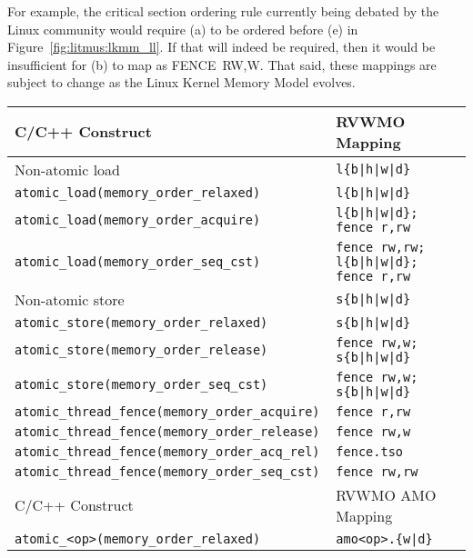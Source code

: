 For example, the critical section ordering rule currently being debated by the Linux community would require (a) to be ordered before (e) in Figure~\ref{fig:litmus:lkmm_ll}.
If that will indeed be required, then it would be insufficient for (b) to map as FENCE~RW,W.
That said, these mappings are subject to change as the Linux Kernel Memory Model evolves.

\begin{table}[h!]
  \centering
  \begin{tabular}{|l|l|}
    \hline
    C/C++ Construct                            & RVWMO Mapping \\
    \hline
    \hline
    Non-atomic load                            & \tt l\{b|h|w|d\}               \\
    \hline
    \tt atomic\_load(memory\_order\_relaxed)   & \tt l\{b|h|w|d\}               \\
    \hline
    \tt atomic\_load(memory\_order\_acquire)   & \tt l\{b|h|w|d\}; fence r,rw    \\
    \hline
    \tt atomic\_load(memory\_order\_seq\_cst)  & \tt fence rw,rw; l\{b|h|w|d\}; fence r,rw       \\
    \hline
    \hline
    Non-atomic store                           & \tt s\{b|h|w|d\}               \\
    \hline
    \tt atomic\_store(memory\_order\_relaxed)  & \tt s\{b|h|w|d\}               \\
    \hline
    \tt atomic\_store(memory\_order\_release)  & \tt fence rw,w; s\{b|h|w|d\}  \\
    \hline
    \tt atomic\_store(memory\_order\_seq\_cst) & \tt fence rw,w; s\{b|h|w|d\}  \\
    \hline
    \hline
    \tt atomic\_thread\_fence(memory\_order\_acquire)  & \tt fence r,rw \\
    \hline
    \tt atomic\_thread\_fence(memory\_order\_release)  & \tt fence rw,w \\
    \hline
    \tt atomic\_thread\_fence(memory\_order\_acq\_rel) & {\tt fence.tso} \\
    \hline
    \tt atomic\_thread\_fence(memory\_order\_seq\_cst) & \tt fence rw,rw \\
    \hline
    \hline
    C/C++ Construct                           & RVWMO AMO Mapping        \\
    \hline
    \tt atomic\_<op>(memory\_order\_relaxed)  & \tt amo<op>.\{w|d\}      \\

\end{tabular}
\end{table}

